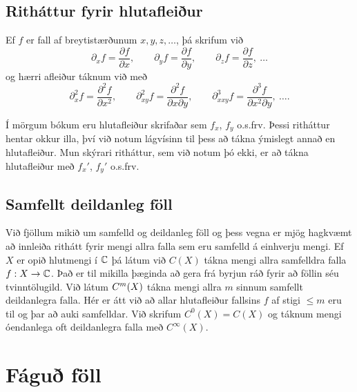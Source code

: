 \subsection*{Ritháttur fyrir hlutafleiður}



Ef $f$ er fall af breytistærðunum $x,y,z,\dots$, þá skrifum við
$$
{\partial}_xf=\dfrac{\partial f}{\partial x}, \qquad
{\partial}_yf=\dfrac{\partial f}{\partial y}, \qquad
{\partial}_zf=\dfrac{\partial f}{\partial z}, \ \dots
$$
og hærri afleiður táknum við með
$$
{\partial}_x^2f=\dfrac{\partial^2f}{\partial x^2}, \qquad
{\partial}_{xy}^2f=\dfrac{\partial^2f}{\partial x\partial y}, \qquad
{\partial}_{xxy}^3f=\dfrac{\partial^3f}{\partial x^2\partial y}, \ \dots.
$$

Í mörgum bókum eru hlutafleiður skrifaðar sem $f_{x}$, $f_y$ o.s.frv.
 Þessi
ritháttur hentar okkur illa, því við notum lágvísinn til þess að tákna
ýmislegt annað en hlutafleiður.  Mun skýrari ritháttur, sem við notum
þó ekki,  er að tákna
hlutafleiður með $f_x'$, $f_y'$ o.s.frv.  

\subsection*{Samfellt deildanleg föll}

\medskip\noindent
Við fjöllum mikið  um
samfelld og deildanleg föll  og 
þess vegna er mjög hagkvæmt að innleiða rithátt fyrir mengi allra falla
sem eru samfelld á einhverju mengi.
Ef $X$ er opið hlutmengi í ${\mathbb C}$ þá látum við $C(X)$ tákna mengi
allra samfelldra falla $f:X\to {\mathbb C}$.  Það er til mikilla þæginda að
gera frá byrjun ráð fyrir að föllin séu tvinntölugild.  Við látum
$C\sp m(X)$ tákna mengi allra $m$ sinnum samfellt
deildanlegra falla.
Hér er átt við að allar hlutafleiður fallsins $f$ af stigi $\leq m$
eru til og þar að auki samfelldar.  Við skrifum $C^0(X)=C(X)$ og
táknum mengi óendanlega oft deildanlegra falla með $C^{\infty}(X)$.


\section{Fáguð föll}


